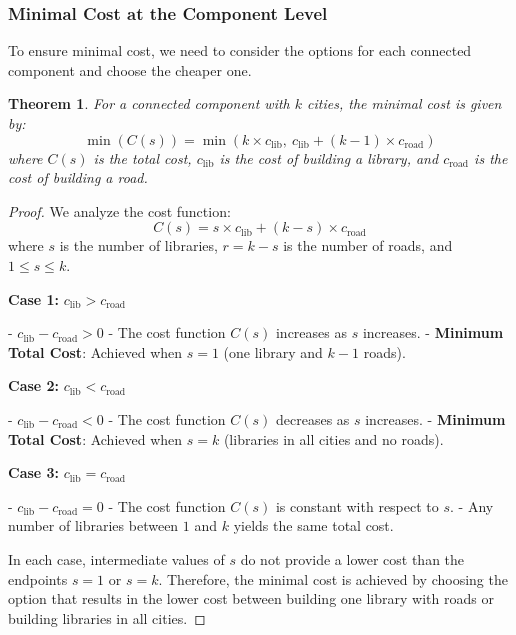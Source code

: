 \documentclass[11pt, a4paper, oneside]{article}
\newtheorem{theorem}{Theorem}
\begin{document}
\subsubsection*{Minimal Cost at the Component Level}

To ensure minimal cost, we need to consider the options for each connected component and choose the cheaper one.

\begin{theorem}
For a connected component with \( k \) cities, the minimal cost is given by:
\[
\min (C(s)) = \min \left( k \times c_{\text{lib}},\ c_{\text{lib}} + (k - 1) \times c_{\text{road}} \right)
\]
where \( C(s) \) is the total cost, \( c_{\text{lib}} \) is the cost of building a library, and \( c_{\text{road}} \) is the cost of building a road.
\end{theorem}

\begin{proof}
We analyze the cost function:
\[
C(s) = s \times c_{\text{lib}} + (k - s) \times c_{\text{road}}
\]
where \( s \) is the number of libraries, \( r = k - s \) is the number of roads, and \( 1 \leq s \leq k \).

\textbf{Case 1:} \( c_{\text{lib}} > c_{\text{road}} \)

- \( c_{\text{lib}} - c_{\text{road}} > 0 \)
- The cost function \( C(s) \) increases as \( s \) increases.
- \textbf{Minimum Total Cost}: Achieved when \( s = 1 \) (one library and \( k - 1 \) roads).

\textbf{Case 2:} \( c_{\text{lib}} < c_{\text{road}} \)

- \( c_{\text{lib}} - c_{\text{road}} < 0 \)
- The cost function \( C(s) \) decreases as \( s \) increases.
- \textbf{Minimum Total Cost}: Achieved when \( s = k \) (libraries in all cities and no roads).

\textbf{Case 3:} \( c_{\text{lib}} = c_{\text{road}} \)

- \( c_{\text{lib}} - c_{\text{road}} = 0 \)
- The cost function \( C(s) \) is constant with respect to \( s \).
- Any number of libraries between \( 1 \) and \( k \) yields the same total cost.

In each case, intermediate values of \( s \) do not provide a lower cost than the endpoints \( s = 1 \) or \( s = k \). Therefore, the minimal cost is achieved by choosing the option that results in the lower cost between building one library with roads or building libraries in all cities.
\end{proof}
\end{document}
